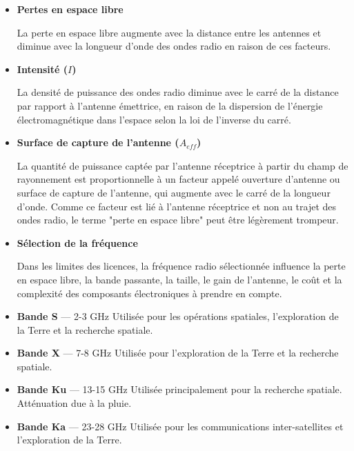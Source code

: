 \begin{itemize}
    \item \textbf{Pertes en espace libre}
    
    La perte en espace libre augmente avec la distance entre les antennes et diminue avec la longueur d'onde des ondes radio en raison de ces facteurs.

    \item \textbf{Intensité (\(I\))} 
    
    La densité de puissance des ondes radio diminue avec le carré de la distance par rapport à l'antenne émettrice, en raison de la dispersion de l'énergie électromagnétique dans l'espace selon la loi de l'inverse du carré.

    \item \textbf{Surface de capture de l'antenne (\(A_{eff}\))} 
    
    La quantité de puissance captée par l'antenne réceptrice à partir du champ de rayonnement est proportionnelle à un facteur appelé ouverture d'antenne ou surface de capture de l'antenne, qui augmente avec le carré de la longueur d'onde. Comme ce facteur est lié à l'antenne réceptrice et non au trajet des ondes radio, le terme "perte en espace libre" peut être légèrement trompeur.

    \item \textbf{Sélection de la fréquence}
    
    Dans les limites des licences, la fréquence radio sélectionnée influence la perte en espace libre, la bande passante, la taille, le gain de l'antenne, le coût et la complexité des composants électroniques à prendre en compte.
\end{itemize}
\begin{itemize}
    \item \textbf{Bande S} — 2-3 GHz  
    Utilisée pour les opérations spatiales, l'exploration de la Terre et la recherche spatiale.
    
    \item \textbf{Bande X} — 7-8 GHz  
    Utilisée pour l'exploration de la Terre et la recherche spatiale.
    
    \item \textbf{Bande Ku} — 13-15 GHz  
    Utilisée principalement pour la recherche spatiale.  
    Atténuation due à la pluie.
    
    \item \textbf{Bande Ka} — 23-28 GHz  
    Utilisée pour les communications inter-satellites et l'exploration de la Terre.
\end{itemize}

